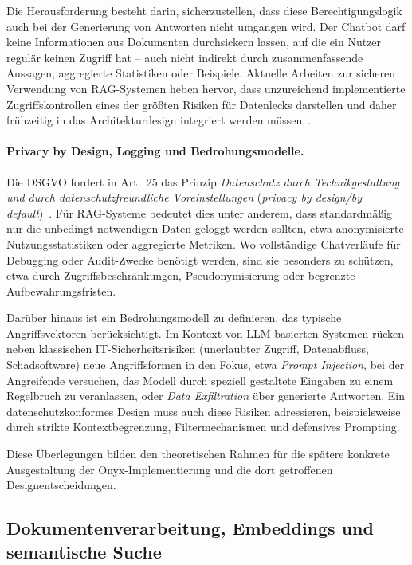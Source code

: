 Die Herausforderung besteht darin, sicherzustellen, dass diese Berechtigungslogik auch bei der Generierung von Antworten nicht umgangen wird.
Der Chatbot darf keine Informationen aus Dokumenten \glqq durchsickern lassen\grqq{}, auf die ein Nutzer regulär keinen Zugriff hat – auch nicht indirekt durch zusammenfassende Aussagen, aggregierte Statistiken oder Beispiele.
Aktuelle Arbeiten zur sicheren Verwendung von RAG-Systemen heben hervor, dass unzureichend implementierte Zugriffskontrollen eines der größten Risiken für Datenlecks darstellen und daher frühzeitig in das Architekturdesign integriert werden müssen~\cite{omnifact2024selfhosted,gao2023retrieval}.

\paragraph{Privacy by Design, Logging und Bedrohungsmodelle.}

Die DSGVO fordert in Art.~25 das Prinzip \textit{Datenschutz durch Technikgestaltung und durch datenschutzfreundliche Voreinstellungen} (\textit{privacy by design/by default})~\cite{gdpr2016}.
Für RAG-Systeme bedeutet dies unter anderem, dass standardmäßig nur die unbedingt notwendigen Daten geloggt werden sollten, etwa anonymisierte Nutzungsstatistiken oder aggregierte Metriken.
Wo vollständige Chatverläufe für Debugging oder Audit-Zwecke benötigt werden, sind sie besonders zu schützen, etwa durch Zugriffsbeschränkungen, Pseudonymisierung oder begrenzte Aufbewahrungsfristen.

Darüber hinaus ist ein Bedrohungsmodell zu definieren, das typische Angriffsvektoren berücksichtigt.
Im Kontext von LLM-basierten Systemen rücken neben klassischen IT-Sicherheitsrisiken (unerlaubter Zugriff, Datenabfluss, Schadsoftware) neue Angriffsformen in den Fokus, etwa \textit{Prompt Injection}, bei der Angreifende versuchen, das Modell durch speziell gestaltete Eingaben zu einem Regelbruch zu veranlassen, oder \textit{Data Exfiltration} über generierte Antworten.
Ein datenschutzkonformes Design muss auch diese Risiken adressieren, beispielsweise durch strikte Kontextbegrenzung, Filtermechanismen und defensives Prompting.

Diese Überlegungen bilden den theoretischen Rahmen für die spätere konkrete Ausgestaltung der Onyx-Implementierung und die dort getroffenen Designentscheidungen.

\subsection{Dokumentenverarbeitung, Embeddings und semantische Suche}
\label{subsec:grundlagen-dokumentenverarbeitung}

